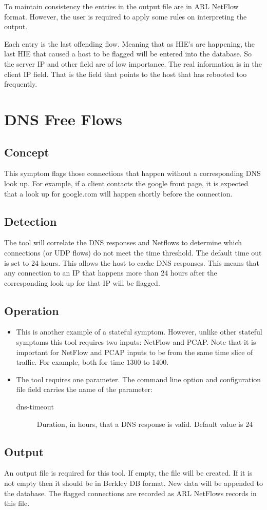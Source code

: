 \documentclass[titlepage,12pt]{report}
\begin{document}
To maintain consistency the entries in the output file are in ARL NetFlow format. However, the user is required to apply some rules on interpreting the output.

Each entry is the last offending flow. Meaning that as HIE's are happening, the last HIE that caused a host to be flagged will be entered into the database. So the server IP and other field are of low importance. The real information is in the client IP field. That is the field that points to the host that has rebooted too frequently.

\section{DNS Free Flows}
\subsection{Concept}
This symptom flags those connections that happen without a corresponding DNS look up. For example, if a client contacts the google front page, it is expected that a look up for google.com will happen shortly before the connection.

\subsection{Detection}
The tool will correlate the DNS responses and Netflows to determine which connections (or UDP flows) do not meet the time threshold. The default time out is set to 24 hours. This allows the host to cache DNS responses. This means that any connection to an IP that happens more than 24 hours after the corresponding look up for that IP will be flagged.

\subsection{Operation}
\begin{itemize}
\item This is another example of a stateful symptom. However, unlike other stateful symptoms this tool requires two inputs: NetFlow and PCAP. Note that it is important for NetFlow and PCAP inputs to be from the same time slice of traffic. For example, both for time $1300$ to $1400$.
\item The tool requires one parameter. The command line option and configuration file field carries the name of the parameter:
	\begin{description}
	\item[dns-timeout] Duration, in hours, that a DNS response is valid. Default value is $24$
	\end{description}
\end{itemize}

\subsection{Output}
An output file is required for this tool. If empty, the file will be created. If it is not empty then it should be in Berkley DB format. New data will be appended to the database. The flagged connections are recorded as ARL NetFlows records in this file.
\end{document}
